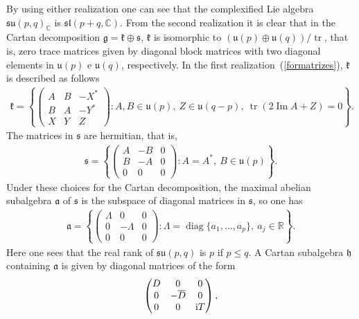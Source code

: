 \documentclass[10pt,a4paper]{amsart}
\numberwithin{equation}{section}
\newcommand{\func}[1]{\operatorname{#1}}
\begin{document}
By using either realization one can see that the complexified Lie algebra $\mathfrak{su}(p,q) _{\mathbb{C}}$ is $\mathfrak{sl} ( p+q,\mathbb{C} ) $. From the second realization it is clear that in the Cartan decomposition $\mathfrak{g}=\mathfrak{k}\oplus \mathfrak{s}$, $\mathfrak{k}$ is isomorphic to $( \mathfrak{u}(p) \oplus \mathfrak{u}(q)) /\operatorname{tr}$, that is, zero trace matrices given by diagonal block matrices with two diagonal elements in $\mathfrak{u}(p) $ e $\mathfrak{u}(q) $, respectively. In the first realization~(\ref{formatrizes}), $\mathfrak{k}$ is described as follows
\begin{gather*}
\mathfrak{k}=\left\{\left(
\begin{matrix}
A & B & -X^{\ast } \\
B & A & -Y^{\ast } \\
X & Y & Z%
\end{matrix}
\right) \colon A,B\in \mathfrak{u}(p), \ Z\in \mathfrak{u} ( q-p), \ \func{tr}(2\func{Im}A+Z)=0\right\}.
\end{gather*}%
The matrices in $\mathfrak{s}$ are hermitian, that is,
\begin{gather*}
\mathfrak{s}=\left\{\left(
\begin{matrix}
A & -B & 0 \\
B & -A & 0 \\
0 & 0 & 0%
\end{matrix}
\right) \colon A=A^{\ast }, \ B\in \mathfrak{u}(p) \right\}.
\end{gather*}%
Under these choices for the Cartan decomposition, the maximal abelian subalgebra $\mathfrak{a}$ of $\mathfrak{s}$ is the subspace of diagonal matrices in $\mathfrak{s}$, so one has
\begin{gather*}
\mathfrak{a}=\left\{\left(
\begin{matrix}
\Lambda & 0 & 0 \\
0 & -\Lambda & 0 \\
0 & 0 & 0%
\end{matrix}
\right) \colon \Lambda =\operatorname{diag}\{a_{1},\ldots,a_{p}\},\ a_{j}\in \mathbb{R}\right\}.
\end{gather*}
Here one sees that the real rank of $\mathfrak{su}(p,q) $ is $p$ if $p\leq q$. A Cartan subalgebra $\mathfrak{h}$ containing $\mathfrak{a}$ is given by diagonal matrices of the form
\begin{gather*}
\left(
\begin{matrix}
D & 0 & 0 \\
0 & -\overline{D} & 0 \\
0 & 0 & {\rm i}T
\end{matrix}
\right),
\end{gather*}
\end{document}

